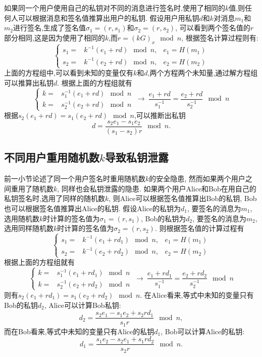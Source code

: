 \documentclass{article}
\begin{document}
如果同一个用户使用自己的私钥对不同的消息进行签名时,使用了相同的$k$值,则任何人可以根据消息和签名值推算出用户的私钥.
假设用户用私钥$d$和$k$对消息$m_1$和$m_2$进行签名,生成了签名值$\sigma_1=(r, s_1)$和$\sigma_2=(r, s_2)$,
可以看到两个签名值的$r$部分相同,这是因为使用了相同的$k$,而$r = (kG)_x \mod n$, 根据签名计算过程则有:
\begin{equation}\nonumber
\left\{
\begin{array}{lll}
s_1 = & k^{-1}(e_1 + rd) \mod n, & e_1 = H(m_1)\\
s_2 = & k^{-1}(e_2 + rd) \mod n, & e_2 = H(m_2)
\end{array}
\right.
\end{equation}
上面的方程组中,可以看到未知的变量仅有$k$和$d$,两个方程两个未知量,通过解方程组可以推算出私钥$d$.
根据上面的方程组就有
\begin{equation}\nonumber
\left\{
\begin{array}{ll}
k = & s_1^{-1} (e_1 + rd) \mod n \\
k = & s_2^{-1} (e_2 + rd) \mod n
\end{array}
\right.
\ 
\rightarrow
\ 
\dfrac{e_1+rd}{s_1^{-1}} = \dfrac{e_2+rd}{s_2^{-1}} \mod n
\end{equation}
根据$s_2(e_1+rd) = s_1(e_2+rd)\mod n$,可以推断出私钥
$$d = \dfrac{s_2e_1 - s_1e_2}{(s_1-s_2)r} \mod n.$$

\subsection{不同用户重用随机数$k$导致私钥泄露\label{subsec-2usereusek}}

前一小节论述了同一个用户签名时重用随机数$k$的安全隐患, 然而如果两个用户之间重用了随机数$k$, 同样也会私钥泄露的隐患.
如果两个用户Alice和Bob在用自己的私钥签名时,选用了同样的随机数$k$,
则Alice可以根据签名值推算出Bob的私钥, Bob也可以根据签名值推算出Alice的私钥.
假设Alice的私钥为$d_1$, 要签名的消息为$m_1$, 选用随机数$k$时计算的签名值为$\sigma_1 = (r, s_1)$,
Bob的私钥为$d_2$, 要签名的消息为$m_2$, 选用同样随机数$k$时计算的签名值为$\sigma_2 = (r, s_2)$.
则根据签名值的计算过程有
\begin{equation}\nonumber
\left\{
\begin{array}{lll}
s_1 = & k^{-1}(e_1 + rd_1) \mod n, & e_1 = H(m_1)\\
s_2 = & k^{-1}(e_2 + rd_2) \mod n, & e_2 = H(m_2)
\end{array}
\right.
\end{equation}
根据上面的方程组就有
\begin{equation}\nonumber
\left\{
\begin{array}{ll}
k = & s_1^{-1} (e_1 + rd_1) \mod n \\
k = & s_2^{-1} (e_2 + rd_2) \mod n
\end{array}
\right.
\ 
\rightarrow
\ 
\dfrac{e_1+rd_1}{s_1^{-1}} = \dfrac{e_2+rd_2}{s_2^{-1}} \mod n
\end{equation}
则有$s_2(e_1+rd_1) = s_1(e_2+rd_2) \mod n$.
在Alice看来,等式中未知的变量只有Bob的私钥$d_2$, Alice可以计算Bob私钥:
$$d_2 = \dfrac{s_2e_1 - s_1e_2 + s_2rd_1}{s_1r} \mod n,$$
而在Bob看来,等式中未知的变量只有Alice的私钥$d_1$, Bob可以计算Alice的私钥:
$$d_1 = \dfrac{s_1e_2 - s_2e_1 + s_1rd_2}{s_2r} \mod n.$$
\end{document}
